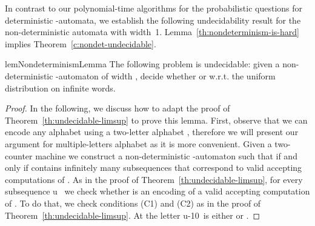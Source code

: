 \documentclass{lmcs}
\begin{document}
\smallskip{}
In contrast to our polynomial-time algorithms for the probabilistic questions for
deterministic -automata, we establish the following
undecidability result for the non-deterministic automata with width~1.
Lemma~\ref{th:nondeterminism-is-hard} implies Theorem~\ref{c:nondet-undecidable}.


\begin{restatable}{lem}{NondeterminismLemma}\label{th:nondeterminism-is-hard}
The following problem is undecidable: given a non-deterministic -automaton  of width ,
decide whether  or  w.r.t.
the uniform distribution on infinite words.
\end{restatable}
\begin{proof}
In the following, we discuss how to adapt the proof
of Theorem~\ref{th:undecidable-limsup} to prove this lemma.
First, observe that we can encode any alphabet  using a two-letter alphabet , therefore we will present our argument
for multiple-letters alphabet as it is more convenient.
Given a two-counter machine  we construct
 a non-deterministic -automaton  such that  if and only if 
contains infinitely many subsequences that correspond to valid accepting computations of .
As in the proof of Theorem~\ref{th:undecidable-limsup}, for every subsequence  u \, we check whether  is an encoding of a  valid accepting computation of .
To do that, we check conditions (C1) and (C2) as in the proof of Theorem~\ref{th:undecidable-limsup}.
At the letter u-10\ is either  or .

\end{proof}
\end{document}
